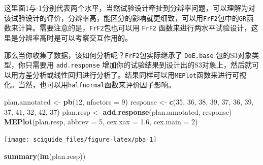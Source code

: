 \documentclass[]{tufte-book}
\newenvironment{Shaded}{}{}
\newcommand{\DataTypeTok}[1]{\textcolor[rgb]{0.56,0.13,0.00}{#1}}
\newcommand{\DecValTok}[1]{\textcolor[rgb]{0.25,0.63,0.44}{#1}}
\newcommand{\FloatTok}[1]{\textcolor[rgb]{0.25,0.63,0.44}{#1}}
\newcommand{\KeywordTok}[1]{\textcolor[rgb]{0.00,0.44,0.13}{\textbf{#1}}}
\newcommand{\NormalTok}[1]{#1}
\newcommand{\StringTok}[1]{\textcolor[rgb]{0.25,0.44,0.63}{#1}}
\begin{document}
这里面1与-1分别代表两个水平，当然试验设计牵扯到分辨率问题，可以理解为对该试验设计的评价，分辨率高，能区分的影响就更细致，可以用\texttt{FrF2}包中的\texttt{GR}函数来计算。需要注意的是，\texttt{FrF2}包也可以用 \texttt{FrF2} 函数来进行两水平试验设计，这里是分辨率高时是可以考察交互作用的。

那么当你收集了数据，该如何分析呢？\texttt{FrF2}包实际继承了 \texttt{DoE.base} 包的S3对象类型，你只需要用 \texttt{add.response} 增加你的试验结果到设计出的S3对象上，然后就可以用方差分析或线性回归进行分析了。结果同样可以用\texttt{MEPlot}函数来进行可视化。当然，也可以用\texttt{halfnormal}函数来评价因子影响。

\begin{Shaded}
\begin{Highlighting}[]
\NormalTok{plan.annotated <-}\StringTok{ }\KeywordTok{pb}\NormalTok{(}\DecValTok{12}\NormalTok{, }\DataTypeTok{nfactors =} \DecValTok{9}\NormalTok{)}
\NormalTok{response <-}\StringTok{ }\KeywordTok{c}\NormalTok{(}\DecValTok{35}\NormalTok{, }\DecValTok{36}\NormalTok{, }\DecValTok{38}\NormalTok{, }\DecValTok{39}\NormalTok{, }\DecValTok{37}\NormalTok{, }\DecValTok{36}\NormalTok{, }\DecValTok{39}\NormalTok{, }\DecValTok{37}\NormalTok{, }\DecValTok{41}\NormalTok{, }\DecValTok{32}\NormalTok{, }\DecValTok{42}\NormalTok{, }\DecValTok{37}\NormalTok{)}
\NormalTok{plan.resp <-}\StringTok{ }\KeywordTok{add.response}\NormalTok{(plan.annotated, response)}
\KeywordTok{MEPlot}\NormalTok{(plan.resp, }\DataTypeTok{abbrev =} \DecValTok{5}\NormalTok{, }\DataTypeTok{cex.xax =} \FloatTok{1.6}\NormalTok{, }\DataTypeTok{cex.main =} \DecValTok{2}\NormalTok{)}
\end{Highlighting}
\end{Shaded}

\texttt{[image: sciguide\_files/figure-latex/pba-1]}

\begin{Shaded}
\begin{Highlighting}[]
\KeywordTok{summary}\NormalTok{(}\KeywordTok{lm}\NormalTok{(plan.resp))}
\end{Highlighting}
\end{Shaded}
\end{document}
